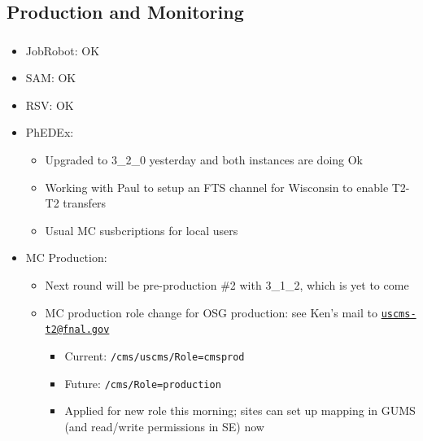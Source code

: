 \documentclass{beamer}
\newcommand{\email}[1]{{\texttt #1}}
\renewcommand{\email}[1]{\href{mailto:#1}{\nolinkurl{#1}}}
\begin{document}
\subsection{Production and Monitoring}
\begin{frame}
\frametitle{}
\begin{itemize}
	\item JobRobot: OK
	\item SAM: OK
	\item RSV: OK
	\item PhEDEx:
	\begin{itemize}
		\item Upgraded to 3\_2\_0 yesterday and both instances are doing Ok
		\item Working with Paul to setup an FTS channel for Wisconsin to enable T2-T2 transfers
		\item Usual MC susbcriptions for local users
	\end{itemize}
	\item MC Production:
	\begin{itemize}
		\item Next round will be pre-production \#2 with 3\_1\_2, which is yet to come
		\item MC production role change for OSG production: see Ken's mail to \email{uscms-t2@fnal.gov}
		\begin{itemize}
			\item Current: {\tt /cms/uscms/Role=cmsprod}
			\item Future: {\tt /cms/Role=production}
			\item Applied for new role this morning; sites can set up mapping in GUMS (and read/write permissions in SE) now
		\end{itemize}
	\end{itemize}
\end{itemize}
\end{frame}
\end{document}
